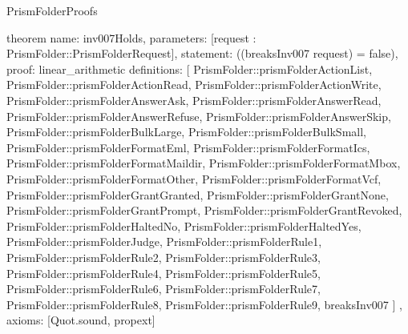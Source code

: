 \begin{lexlean}{PrismFolderProofs}
\begin{semanticmodule}
theorem{
  name: inv007Holds,
  parameters: [request : PrismFolder::PrismFolderRequest],
  statement: ((breaksInv007 request) = false),
  proof: linear_arithmetic{
    definitions: [
      PrismFolder::prismFolderActionList,
      PrismFolder::prismFolderActionRead,
      PrismFolder::prismFolderActionWrite,
      PrismFolder::prismFolderAnswerAsk,
      PrismFolder::prismFolderAnswerRead,
      PrismFolder::prismFolderAnswerRefuse,
      PrismFolder::prismFolderAnswerSkip,
      PrismFolder::prismFolderBulkLarge,
      PrismFolder::prismFolderBulkSmall,
      PrismFolder::prismFolderFormatEml,
      PrismFolder::prismFolderFormatIcs,
      PrismFolder::prismFolderFormatMaildir,
      PrismFolder::prismFolderFormatMbox,
      PrismFolder::prismFolderFormatOther,
      PrismFolder::prismFolderFormatVcf,
      PrismFolder::prismFolderGrantGranted,
      PrismFolder::prismFolderGrantNone,
      PrismFolder::prismFolderGrantPrompt,
      PrismFolder::prismFolderGrantRevoked,
      PrismFolder::prismFolderHaltedNo,
      PrismFolder::prismFolderHaltedYes,
      PrismFolder::prismFolderJudge,
      PrismFolder::prismFolderRule1,
      PrismFolder::prismFolderRule2,
      PrismFolder::prismFolderRule3,
      PrismFolder::prismFolderRule4,
      PrismFolder::prismFolderRule5,
      PrismFolder::prismFolderRule6,
      PrismFolder::prismFolderRule7,
      PrismFolder::prismFolderRule8,
      PrismFolder::prismFolderRule9,
      breaksInv007
    ]
  },
  axioms: [Quot.sound, propext]
}
\end{semanticmodule}
\end{lexlean}
